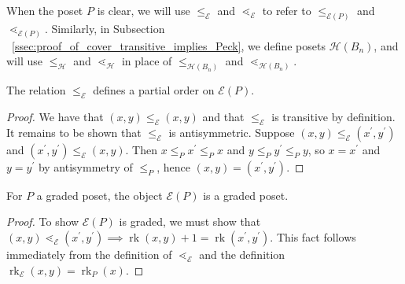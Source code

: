 \documentclass[smallextended, envcountsame, numbook]{svjour3}
\numberwithin{equation}{section}
\newcommand\rk{\operatorname{rk}}
\begin{document}
When the poset $P$ is clear, we will use $\leq_{\mathcal E}$ and $\lessdot_{\mathcal E}$ to refer to $\leq_{\mathcal E(P)}$ and $\lessdot_{\mathcal E(P)}$. Similarly, in Subsection ~\ref{ssec:proof_of_cover_transitive_implies_Peck}, we define posets $\mathcal H(B_n)$, and will use $\leq_{\mathcal H}$ and $\lessdot_{\mathcal H}$ in place of $\leq_{\mathcal H(B_n)}$ and $\lessdot_{\mathcal H(B_n)}$.

\begin{lemma}\label{lem:f_partial_order}
The relation $\le_{\mathcal E}$ defines a partial order on $\mathcal E(P)$.
\end{lemma}

\begin{proof}
We have that $(x, y)\le_{\mathcal E} (x, y)$ and that $\le_{\mathcal E}$ is transitive by definition.  It remains to be shown that $\le_{\mathcal E}$ is antisymmetric.  Suppose $(x, y)\le_{\mathcal E} (x^\prime, y^\prime)$ and $(x^\prime, y^\prime)\le_{\mathcal E} (x, y)$.  Then $x\le_P x^\prime \le_P x$ and $y\le_P y^\prime \le_P y$, so $x = x^\prime$ and $y=y^\prime$ by antisymmetry of $\le_P$, hence $(x, y) = (x^\prime, y^\prime)$.
\end{proof}

\begin{lemma}\label{lem:FP_graded_poset}
For $P$ a graded poset, the object $\mathcal E(P)$ is a graded poset.
\end{lemma}

\begin{proof}
To show $\mathcal E(P)$ is graded, we must show that $(x, y) \lessdot_{\mathcal E} (x^\prime, y^\prime) \implies \rk(x, y)+1 = \rk(x^\prime , y^\prime)$.  This fact follows immediately from the definition of $\lessdot_{\mathcal E}$ and the definition $\rk_{\mathcal E}(x, y) = \rk_P(x)$.
\end{proof}
\end{document}
